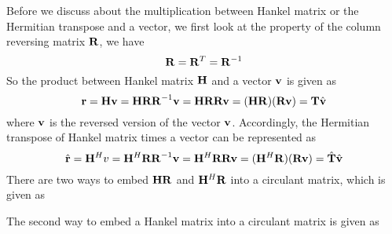 \documentclass[revised,endfloat]{geophysics}
\begin{document}
Before we discuss about the multiplication between Hankel matrix or the Hermitian transpose and a vector, we first look at the property of the column reversing matrix ${\bf R}$, we have 
\begin{equation}
{\bf R} = {\bf R}^T = {\bf R}^{-1}
\end{equation}
So the product between Hankel matrix ${\bf H}$ and a vector ${\bf v}$ is given as 
\begin{equation}
{\bf r} = {\bf Hv} = {\bf HRR}^{-1}{\bf v} = {\bf HRRv} = ({\bf HR})({\bf Rv}) = {\bf T} \hat {\bf v}
\end{equation}
where $\bf{v}$ is the reversed version of the vector ${\bf v}$. Accordingly, the Hermitian transpose of Hankel matrix times a vector can be represented as
\begin{equation}
\hat{\bf r} = {\bf H}^H{v} = {\bf H}^H {\bf RR}^{-1}{\bf v} = {\bf H}^H{\bf RRv} = ({\bf H}^H{\bf R})({\bf Rv}) = \hat{\bf T} \hat {\bf v}
\end{equation}
There are two ways to embed ${\bf HR}$ and ${\bf H}^H {\bf R}$ into a circulant matrix, which is given as
\begin{center}
\end{center}
The second way to embed a Hankel matrix into a circulant matrix is given as
\begin{center}
\end{center}
\end{document}
